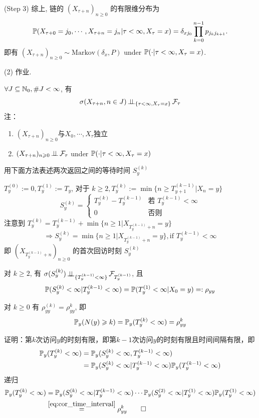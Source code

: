 (Step 3) 综上, 链的 \((X_{\tau + n})_{n \geq 0}\) 的有限维分布为
\[
\mathbb{P}(X_{\tau + 0} = j_0, \cdots, X_{\tau + n} = j_n | \tau < \infty, X_\tau = x) = \delta_{x j_0} \prod_{k=0}^{n-1} p_{j_k j_{k+1}}.
\]
即有 \((X_{\tau + n})_{n \geq 0} \sim \text{Markov}(\delta_x, P)\) under $\mathbb{P}(\cdot|\tau<\infty,X_{\tau}=x)$.

(2) 作业.

\begin{problem}[作业5-3]
$\forall J\subseteq \mathbb{N}_0, \#J<\infty$, 有
\[
\sigma(X_{\tau+n},n\in J)\operatorname{\perp\!\!\!\perp}_{\{\tau<\infty,X_{\tau}=x\}}\mathcal{F}_{\tau}
\]
注：\begin{enumerate}
    \item $(X_{\tau+n})_{n\geq 0}$与$X_0,\cdots,X_{\tau}$独立
    \item $(X_{\tau+n})_{n\geqslant 0}\operatorname{\perp\!\!\!\perp} \mathcal{F}_{\tau}$ under $\mathbb{P}(\cdot|\tau<\infty,X_{\tau}=x)$
\end{enumerate}
\end{problem}

用下面方法表述两次返回之间的等待时间 $S_y^{(k)}$

$T_y^{(0)}:=0, T_y^{(1)}:=T_y$, 对于 $k\geq 2, T_y^{(k)}:=\min\{n\geq T_{y+1}^{(k-1)}|X_n=y\}$
\[
S_y^{(k)}=\begin{cases}
    T_y^{(k)}-T_y^{(k-1)}&\text{若 }T_y^{(k-1)}<\infty\\
    0 & \text{否则}
\end{cases}
\]
注意到 $T_y^{(k)}=T_y^{(k-1)}+\min\{n\geq 1|X_{T_y^{(k-1)}+n}=y\}$
\[
\Rightarrow S_y^{(k)}=\min\{n\geq 1|X_{T_y^{(k-1)}+n}=y\}, \text{if }T_y^{(k-1)}<\infty
\]
即 $(X_{T_y^{(k-1)}+n})_{n\geq 0}$ 的首次回访时刻 $S_y^{(k)}$

\begin{lemma}
    对 $k\geq 2$, 有 $\sigma(S_y^{(k)})\operatorname{\perp\!\!\!\perp}_{\{T_y^{(k-1)}<\infty\}}\mathcal{F}_{T_y^{(k-1)}}$, 且\
    \begin{equation}
\mathbb{P}(S_y^{(k)}<\infty|T_y^{(k-1)}<\infty)=\mathbb{P}(T_y^{(1)}<\infty|X_0=y)=:\rho_{yy}
\label{eq:cor_time_interval}
\end{equation}
\end{lemma}

\begin{corollary}
    对 $k\geq 0$ 有 $\rho_{yy}^{(k)}=\rho_{yy}^k$, 即
    \[
    \mathbb{P}_y(N(y)\geqslant k)=\mathbb{P}_y(T_y^{(k)}<\infty)=\rho_{yy}^k
    \]
\end{corollary}
证明：第$k$次访问$y$的时刻有限，即第$k-1$次访问$y$的时刻有限且时间间隔有限，即
\[
\begin{aligned}
\mathbb{P}_y(T_y^{(k)}<\infty)&=\mathbb{P}_y(S_y^{(k)}<\infty, T_y^{(k-1)}<\infty)\\
&=\mathbb{P}_y(S_y^{(k)}<\infty| T_y^{(k-1)}<\infty)\mathbb{P}_y(T_y^{(k-1)}<\infty)
\end{aligned}
\]
递归
\[
\begin{aligned}
\mathbb{P}_y(T_y^{(k)}<\infty)&=\mathbb{P}_y(S_y^{(k)}<\infty| T_y^{(k-1)}<\infty)\cdots \mathbb{P}_y(S_y^{(2)}<\infty| T_y^{(1)}<\infty)\mathbb{P}_y(T_y^{(1)}<\infty)\\
&\overset{\eqref{eq:cor_time_interval}}{=}\rho_{yy}^k\qed
\end{aligned}
\]

